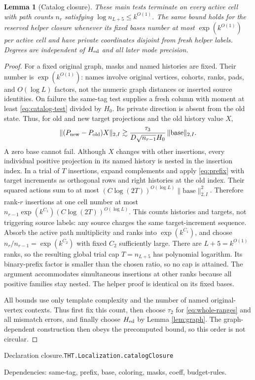 \documentclass[11pt]{article}
\newtheorem{lemma}[theorem]{Lemma}
\theoremstyle{definition}
\numberwithin{equation}{section}
\newcommand{\bp}[3]{\par\smallskip\begingroup\footnotesize
\noindent\hypertarget{bp:#1}{\textsf{Declaration #1.}}\quad\nolinkurl{#2}\par
\noindent\textsf{Dependencies:} #3.\par\endgroup\smallskip}
\begin{document}
\begin{lemma}[Catalog closure]\label{lem:closure}
These main tests terminate on every active cell with path counts $n_r$ satisfying $\log n_{L+5}\le k^{O(1)}$. The same bound holds for the reserved helper closure whenever its fixed bases number at most $\exp(k^{O(1)})$ per active cell and have private coordinates disjoint from fresh helper labels. Degrees are independent of $H_{\rm ed}$ and all later mode precision.
\end{lemma}
\begin{proof}
For a fixed original graph, masks and named histories are fixed. Their number is $\exp(k^{O(1)})$: names involve original vertices, cohorts, ranks, pads, and $O(\log L)$ factors, not the numeric graph distances or inserted source identities. On failure the same-tag test supplies a fresh column with moment at least \eqref{eq:catalog-test} divided by $H_0$. Its private direction is absent from the old state. Thus, for old and new target projections and the old history value $X$,
\[
 \|(P_{\rm new}-P_{\rm old})X\|_{2,I}
 \gtrsim\frac{\tau_3}{D\sqrt{n_{r-1}}H_0}\,\|\text{base}\|_{2,I}.
\]
A zero base cannot fail. Although $X$ changes with other insertions, every individual positive projection in its named history is nested in the insertion index. In a trial of $T$ insertions, expand complements and apply \eqref{eq:prefix} with target increments as orthogonal rows and right histories at the old index. Their squared actions sum to at most $(C\log(2T))^{O(\log L)}\|\text{base}\|_{2,I}^2$. Therefore rank-$r$ insertions at one cell number at most $n_{r-1}\exp(k^{C_1})(C\log(2T))^{O(\log L)}$. This counts histories and targets, not triggering source labels: any source charges the same target-increment sequence. Absorb the active path multiplicity and ranks into $\exp(k^{C_1})$, and choose $n_r/n_{r-1}=\exp(k^{C_2})$ with fixed $C_2$ sufficiently large. There are $L+5=k^{O(1)}$ ranks, so the resulting global trial cap $T=n_{L+5}$ has polynomial logarithm. Its binary-prefix factor is smaller than the chosen ratio, so no cap is attained. The argument accommodates simultaneous insertions at other ranks because all positive families stay nested. The helper proof is identical on its fixed bases.

All bounds use only template complexity and the number of named original-vertex contexts. Thus first fix this count, then choose $\tau_2$ for \eqref{eq:whole-ranges} and all mismatch errors, and finally choose $H_{\rm ed}$ by Lemma \ref{lem:graph}. The graph-dependent construction then obeys the precomputed bound, so this order is not circular.
\end{proof}
\bp{closure}{THT.Localization.catalogClosure}{same-tag, prefix, base, coloring, masks, coeff, budget-rules}
\end{document}
